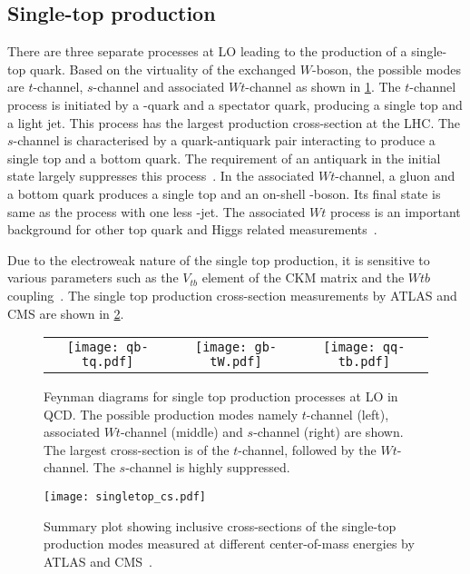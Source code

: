 \subsection*{Single-top production}
There are three separate processes at LO leading to the production of a single-top quark.
Based on the virtuality of the exchanged $W$-boson, the possible modes
are $t$-channel, $s$-channel and associated $Wt$-channel as shown in \cref{fig:topprod}.
The $t$-channel process is initiated by a \Pbottom-quark and a spectator quark, producing 
a single top and a light jet. This process has the largest production cross-section at the LHC.
The $s$-channel is characterised by a quark-antiquark pair interacting to produce
a single top and a bottom quark. The requirement of an antiquark in the initial state largely
suppresses this process~\cite{Cristinziani_2017}. In the associated $Wt$-channel,
a gluon and a bottom quark produces a single top and an on-shell \PW-boson. Its final state is 
same as the \ttbar process with one less \Pbottom-jet. The associated $Wt$ process is an 
important background for other top quark and Higgs related measurements~\cite{TOPQ-2024-07}.

Due to the electroweak
nature of the single top production, it is sensitive to various parameters such as 
the $V_{tb}$ element of the CKM matrix and the $Wtb$ coupling~\cite{Andrea:2023yap}. The 
single top production cross-section measurements by ATLAS and CMS are shown in \cref{fig:singletop_cs}.

\begin{figure}[htbp]
    \centering
    \begin{tabular}{ccc}
      \texttt{[image: qb-tq.pdf]} &
      \texttt{[image: gb-tW.pdf]} &
      \texttt{[image: qq-tb.pdf]} \\[1ex]
    \end{tabular}
    \caption[Feynman diagrams for single-top production processes at LO in QCD]{Feynman diagrams
    for single top production processes at LO in QCD. The possible production modes namely
    $t$-channel (left), associated $Wt$-channel (middle) and $s$-channel (right) are shown. The
    largest cross-section is of the $t$-channel, followed by the $Wt$-channel. The $s$-channel
    is highly suppressed.}
    \label{fig:topprod}
  \end{figure}
  
\begin{figure}[htbp]
    \centering
    \texttt{[image: singletop\_cs.pdf]}
    \caption[Cross-section of the single top production]{Summary plot showing inclusive cross-sections
    of the single-top production modes measured at different center-of-mass energies by ATLAS
    and CMS~\cite{ATL-PHYS-PUB-2024-006}.}%
    \label{fig:singletop_cs}
\end{figure}

